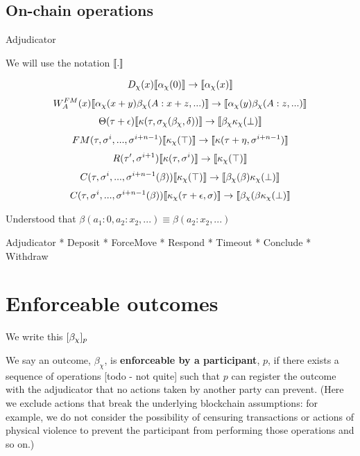 

\subsection{On-chain operations}

Adjudicator

We will use the notation $\llbracket . \rrbracket$

\begin{align*}
D_\chi(x) \llbracket \alpha_\chi(0) \rrbracket \rightarrow \llbracket \alpha_\chi(x) \rrbracket
\end{align*}
\begin{align*}
W^{FM}_A(x) \llbracket \alpha_\chi(x + y)\beta_\chi(A: x + z, ...) \rrbracket \rightarrow \llbracket \alpha_\chi(y)\beta_\chi(A: z, ...) \rrbracket
\end{align*}
\begin{align*}
\Theta(\tau + \epsilon) \llbracket \kappa(\tau, \sigma_\chi(\beta_\chi, \delta)) \rrbracket \rightarrow \llbracket \beta_\chi \kappa_\chi(\bot) \rrbracket
\end{align*}
\begin{align*}
FM(\tau, \sigma^i, ..., \sigma^{i+n-1}) \llbracket \kappa_\chi(\top) \rrbracket \rightarrow \llbracket \kappa(\tau + \eta, \sigma^{i+n-1}) \rrbracket
\end{align*}
\begin{align*}
R(\tau', \sigma^{i+1})\llbracket \kappa(\tau, \sigma^i) \rrbracket \rightarrow \llbracket \kappa_\chi(\top) \rrbracket
\end{align*}
\begin{align*}
C(\tau, \sigma^i, ..., \sigma^{i+n-1}(\beta)) \llbracket \kappa_\chi(\top) \rrbracket \rightarrow \llbracket \beta_\chi(\beta) \kappa_\chi(\bot) \rrbracket
\end{align*}
\begin{align*}
C(\tau, \sigma^i, ..., \sigma^{i+n-1}(\beta)) \llbracket \kappa_\chi(\tau + \epsilon, \sigma) \rrbracket \rightarrow \llbracket \beta_\chi(\beta \kappa_\chi(\bot) \rrbracket
\end{align*}

Understood that $\beta(a_1: 0, a_2:x_2,...) \equiv \beta(a_2:x_2, ...)$


Adjudicator
* Deposit
* ForceMove
* Respond
* Timeout
* Conclude
* Withdraw

\section{Enforceable outcomes}

We write this $[\beta_\chi]_p$

We say an outcome, $\beta_\chi$, is \textbf{enforceable by a participant}, $p$, if there exists a sequence of operations [todo - not quite] such that $p$ can register the outcome with the adjudicator that no actions taken by another party can prevent. (Here we exclude actions that break the underlying blockchain assumptions: for example, we do not consider the possibility of censuring transactions or actions of physical violence to prevent the participant from performing those operations and so on.)

